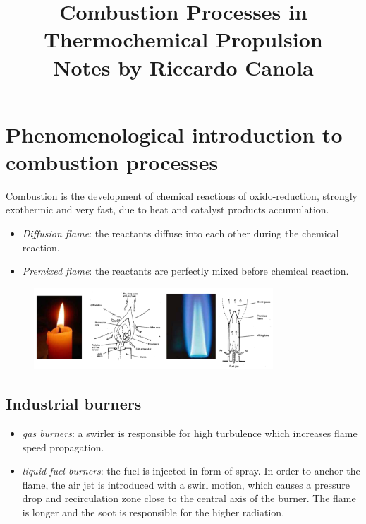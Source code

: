 \documentclass[12pt]{article}
\title{
   Combustion Processes in Thermochemical Propulsion\\
  \large Notes by Riccardo Canola}
\date{}
\begin{document}
\maketitle

\newpage

\tableofcontents

\newpage

\section{Phenomenological introduction to combustion processes}

Combustion is the development of chemical reactions of oxido-reduction, strongly exothermic and very fast, due to heat and catalyst products accumulation.
\begin{itemize}
    \item \textit{Diffusion flame}: the reactants diffuse into each other during the chemical reaction.
    \item \textit{Premixed flame}: the reactants are perfectly mixed before chemical reaction.
\end{itemize}

\begin{figure}[h!]
\centering
\includegraphics[width=0.8\textwidth]{figures/diffusion_premixed.png}
\end{figure}

\subsection{Industrial burners}

\begin{itemize}
    \item \textit{gas burners}: a swirler is responsible for high turbulence which increases flame speed propagation.
    \item \textit{liquid fuel burners}: the fuel is injected in form of spray. In order to anchor the flame, the air jet is introduced with a swirl motion, which causes a pressure drop and recirculation zone close to the central axis of the burner. The flame is longer and the soot is responsible for the higher radiation.
\end{itemize}
\end{document}
